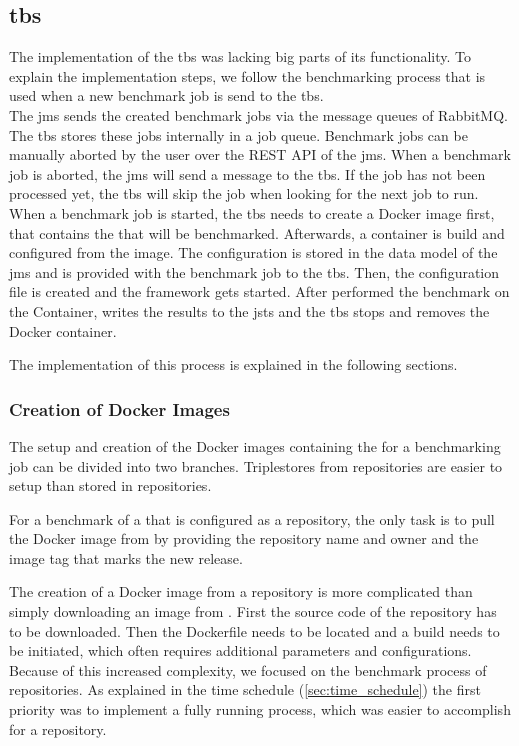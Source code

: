 \subsection{\acl{tbs}}
The implementation of the \acl{tbs} was lacking big parts of its functionality.
To explain the implementation steps, we follow the benchmarking process that is used when a new benchmark job is send to the \ac{tbs}.
\\

The \ac{jms} sends the created benchmark jobs via the message queues of RabbitMQ.
The \ac{tbs} stores these jobs internally in a job queue.
Benchmark jobs can be manually aborted by the user over the REST API of the \ac{jms}.
When a benchmark job is aborted, the \ac{jms} will send a message to the \ac{tbs}.
If the job has not been processed yet, the \ac{tbs} will skip the job when looking for the next job to run.
\\

When a benchmark job is started, the \ac{tbs} needs to create a Docker image first, that contains the \ts{} that will be benchmarked.
Afterwards, a container is build and configured from the image.
The configuration is stored in the data model of the \ac{jms} and is provided with the benchmark job to the \ac{tbs}.
Then, the \iguana{} configuration file is created and the framework gets started.
After \iguana{} performed the benchmark on the Container, \iguana{} writes the results to the \ac{jsts} and the \ac{tbs} stops and removes the Docker container.

The implementation of this process is explained in the following sections.


\subsubsection{Creation of Docker Images}
The setup and creation of the Docker images containing the \ts{} for a benchmarking job can be divided into two branches.
Triplestores from \dockh{} repositories are easier to setup than \tsp{} stored in \gh{} repositories.

For a benchmark of a \ts{} that is configured as a \dockh{} repository, the only task is to pull the Docker image from \dockh{} by providing the repository name and owner and the image tag that marks the new release.

The creation of a Docker image from a \gh{} repository is more complicated than simply downloading an image from \dockh{}.
First the source code of the repository has to be downloaded. 
Then the Dockerfile needs to be located and a build needs to be initiated, which often requires additional parameters and configurations.
Because of this increased complexity, we focused on the benchmark process of \dockh{} repositories.
As explained in the time schedule (\ref{sec:time_schedule}) the first priority was to implement a fully running process, which was easier to accomplish for a \dockh{} repository.
\\

